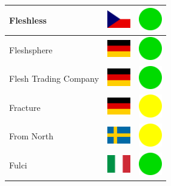\documentclass[12pt, a4paper, twoside]{report}
\begin{document}
\begin{center}
\begin{longtable}{|p{5cm}|p{2cm}|p{2cm}|}
Fleshless & \includegraphics[width=1cm]{4x3/cz} & \includegraphics[width=1cm]{likes/y} \\ \hline
Fleshsphere & \includegraphics[width=1cm]{4x3/de} & \includegraphics[width=1cm]{likes/y} \\ \hline
Flesh Trading Company & \includegraphics[width=1cm]{4x3/de} & \includegraphics[width=1cm]{likes/y} \\ \hline
Fracture & \includegraphics[width=1cm]{4x3/de} & \includegraphics[width=1cm]{likes/m} \\ \hline
From North & \includegraphics[width=1cm]{4x3/se} & \includegraphics[width=1cm]{likes/m} \\ \hline
Fulci & \includegraphics[width=1cm]{4x3/it} & \includegraphics[width=1cm]{likes/y} \\ \hline

\end{longtable}
\end{center}
\end{document}

